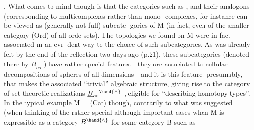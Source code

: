 .  What comes to mind though is that the categories such as \hand{$\Delta$} , \hand{$\square$}
and their analogons (corresponding to multicomplexes rather than mono-%
complexes, for instance\over{\unsure{,}}{)}  can be viewed as (generally not full) subcate-%
gories of M  (in fact,  even of the smaller category (Ord) of all orde
sets).  The topologies we found on M were in fact associated in an evi-%
dent way to the choice of such subcategories.  As was already felt by
the end of the reflection two days ago (p.21),  these subcategories
(denoted there by $\underline{B}_{oo}$  ) have rather special features  -  they are
associated to  cellular decompositions of spheres of all dimensions  -
and it is this feature,  presumably,  that makes the associated ``trivial''
algebraic structure, giving rise to the category of set-theoretic
realizations  $\underline{B}_{oo}{}^{\hand{\wedge}}$ ,  eligible for ``describing homotopy types''.  In the
typical example M = (Cat) though,  contrarily to what was suggested 
  (when thinking  of the rather special although important cases
when M is expressible  as a category  $B^{\hand{\wedge}}$\hand{,} for some category B such as
